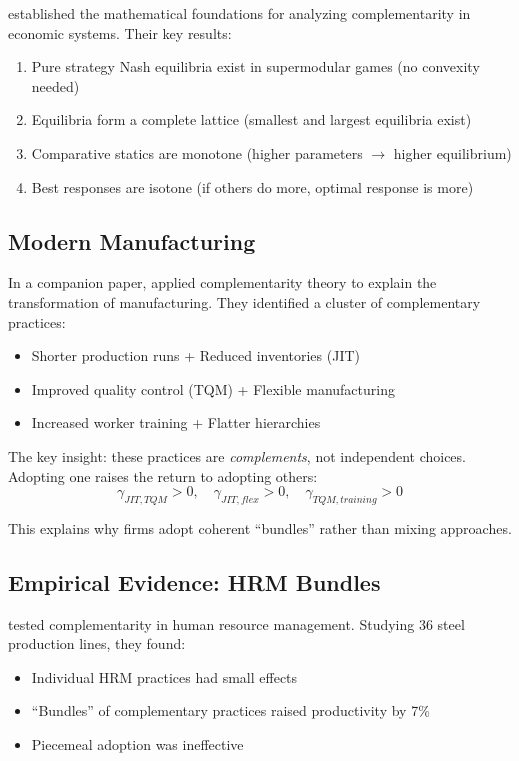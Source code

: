 \citet{milgromroberts1990compare} established the mathematical foundations
for analyzing complementarity in economic systems. Their key results:
\begin{enumerate}
  \item Pure strategy Nash equilibria exist in supermodular games (no convexity needed)
  \item Equilibria form a complete lattice (smallest and largest equilibria exist)
  \item Comparative statics are monotone (higher parameters $\to$ higher equilibrium)
  \item Best responses are isotone (if others do more, optimal response is more)
\end{enumerate}

\subsection{Modern Manufacturing}

In a companion paper, \citet{milgromroberts1990modern} applied complementarity theory
to explain the transformation of manufacturing. They identified a cluster of
complementary practices:
\begin{itemize}[nosep]
  \item Shorter production runs + Reduced inventories (JIT)
  \item Improved quality control (TQM) + Flexible manufacturing
  \item Increased worker training + Flatter hierarchies
\end{itemize}

The key insight: these practices are \emph{complements}, not independent choices.
Adopting one raises the return to adopting others:
\begin{equation}
  \gamma_{JIT,TQM} > 0, \quad \gamma_{JIT,flex} > 0, \quad \gamma_{TQM,training} > 0
\end{equation}

This explains why firms adopt coherent ``bundles'' rather than mixing approaches.

\subsection{Empirical Evidence: HRM Bundles}

\citet{ichniowski1997} tested complementarity in human resource management.
Studying 36 steel production lines, they found:
\begin{itemize}[nosep]
  \item Individual HRM practices had small effects
  \item ``Bundles'' of complementary practices raised productivity by 7\%
  \item Piecemeal adoption was ineffective
\end{itemize}

